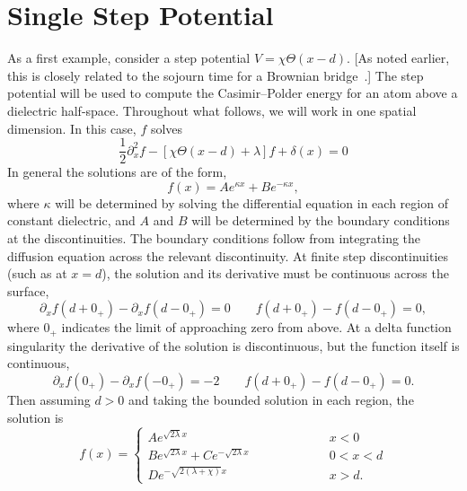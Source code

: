\section{Single Step Potential}
\label{sec:TE_onebody_FK}
As a first example, consider a step potential $V=\chi\Theta(x-d)$.
[As noted earlier, this is closely related to the sojourn time for a Brownian bridge~\citep{Hooghiemstra2002}.]
The step potential will be used to compute the Casimir--Polder energy for an atom 
above a dielectric half-space.
Throughout what follows, we will work in one spatial dimension.  
In this case, $f$ solves
\begin{equation}
   \frac{1}{2}\partial_x^2 f - [\chi\Theta(x-d)+\lambda]f + \delta(x) =0
\end{equation}
In general the solutions are of the form, 
\begin{equation}
  f(x) = A e^{\kappa x} + B e^{-\kappa x},
\end{equation}
where $\kappa$ will be determined by solving the differential equation in each region of constant dielectric,
 and $A$ and $B$ will be determined by the boundary conditions at the discontinuities.
The boundary conditions follow from integrating the diffusion equation across the relevant discontinuity.  
At finite step discontinuities (such as at $x=d$), the solution and its derivative must be continuous across the surface,
\begin{equation}
  \partial_xf(d+0_+) - \partial_x f(d-0_+) = 0 \qquad f(d+0_+)-f(d-0_+) = 0,  \label{eq:step_BC}
\end{equation}
where $0_+$ indicates the limit of approaching zero from above.  
At a delta function singularity the derivative of the solution is discontinuous, but the function itself
is continuous,
\begin{equation}
  \partial_xf(0_+) -\partial_x f(-0_+) = -2  \qquad f(d+0_+)-f(d-0_+) = 0.\label{eq:delta_BC}
\end{equation}
Then assuming $d>0$ and taking the bounded solution in each region, the solution is 
\begin{equation}
  f(x) =\left\{ 
    \begin{array}{lcr}  A e^{\sqrt{2\lambda} x} & \hspace{2cm} & x<0\\
      B e^{\sqrt{2\lambda}x} + Ce^{-\sqrt{2\lambda}x} & \hspace{2cm} & 0<x<d\\
      D e^{-\sqrt{2(\lambda+\chi)}x} & \hspace{2cm} & x>d.
    \end{array}
  \right.
\end{equation}
